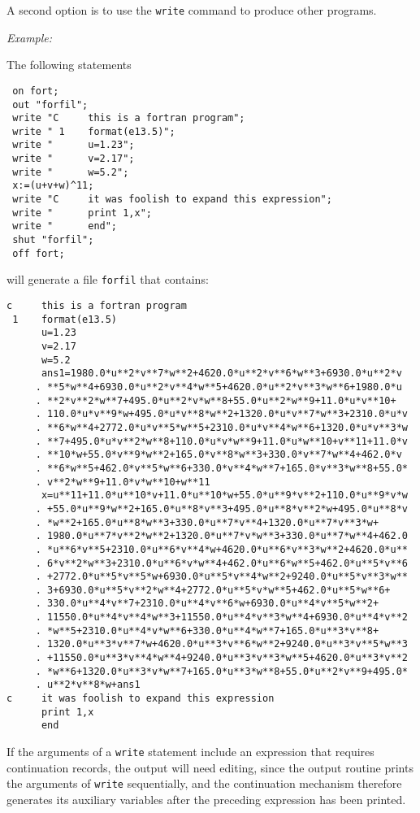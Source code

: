 A second option is to use the \texttt{write} command to produce other programs.

\textit{Example:}

The following {\REDUCE} statements
\begin{verbatim}
 on fort;
 out "forfil";
 write "C     this is a fortran program";
 write " 1    format(e13.5)";
 write "      u=1.23";
 write "      v=2.17";
 write "      w=5.2";
 x:=(u+v+w)^11;
 write "C     it was foolish to expand this expression";
 write "      print 1,x";
 write "      end";
 shut "forfil";
 off fort;
\end{verbatim}
will generate a file \texttt{forfil} that contains:

{\scriptsize
\begin{verbatim}
c     this is a fortran program
 1    format(e13.5)
      u=1.23
      v=2.17
      w=5.2
      ans1=1980.0*u**2*v**7*w**2+4620.0*u**2*v**6*w**3+6930.0*u**2*v
     . **5*w**4+6930.0*u**2*v**4*w**5+4620.0*u**2*v**3*w**6+1980.0*u
     . **2*v**2*w**7+495.0*u**2*v*w**8+55.0*u**2*w**9+11.0*u*v**10+
     . 110.0*u*v**9*w+495.0*u*v**8*w**2+1320.0*u*v**7*w**3+2310.0*u*v
     . **6*w**4+2772.0*u*v**5*w**5+2310.0*u*v**4*w**6+1320.0*u*v**3*w
     . **7+495.0*u*v**2*w**8+110.0*u*v*w**9+11.0*u*w**10+v**11+11.0*v
     . **10*w+55.0*v**9*w**2+165.0*v**8*w**3+330.0*v**7*w**4+462.0*v
     . **6*w**5+462.0*v**5*w**6+330.0*v**4*w**7+165.0*v**3*w**8+55.0*
     . v**2*w**9+11.0*v*w**10+w**11
      x=u**11+11.0*u**10*v+11.0*u**10*w+55.0*u**9*v**2+110.0*u**9*v*w
     . +55.0*u**9*w**2+165.0*u**8*v**3+495.0*u**8*v**2*w+495.0*u**8*v
     . *w**2+165.0*u**8*w**3+330.0*u**7*v**4+1320.0*u**7*v**3*w+
     . 1980.0*u**7*v**2*w**2+1320.0*u**7*v*w**3+330.0*u**7*w**4+462.0
     . *u**6*v**5+2310.0*u**6*v**4*w+4620.0*u**6*v**3*w**2+4620.0*u**
     . 6*v**2*w**3+2310.0*u**6*v*w**4+462.0*u**6*w**5+462.0*u**5*v**6
     . +2772.0*u**5*v**5*w+6930.0*u**5*v**4*w**2+9240.0*u**5*v**3*w**
     . 3+6930.0*u**5*v**2*w**4+2772.0*u**5*v*w**5+462.0*u**5*w**6+
     . 330.0*u**4*v**7+2310.0*u**4*v**6*w+6930.0*u**4*v**5*w**2+
     . 11550.0*u**4*v**4*w**3+11550.0*u**4*v**3*w**4+6930.0*u**4*v**2
     . *w**5+2310.0*u**4*v*w**6+330.0*u**4*w**7+165.0*u**3*v**8+
     . 1320.0*u**3*v**7*w+4620.0*u**3*v**6*w**2+9240.0*u**3*v**5*w**3
     . +11550.0*u**3*v**4*w**4+9240.0*u**3*v**3*w**5+4620.0*u**3*v**2
     . *w**6+1320.0*u**3*v*w**7+165.0*u**3*w**8+55.0*u**2*v**9+495.0*
     . u**2*v**8*w+ans1
c     it was foolish to expand this expression
      print 1,x
      end
\end{verbatim}
}
If the arguments of a \texttt{write} statement include an expression that
requires continuation records, the output will need editing, since the
output routine prints the arguments of \texttt{write} sequentially, and the
continuation mechanism therefore generates its auxiliary variables after
the preceding expression has been printed.

